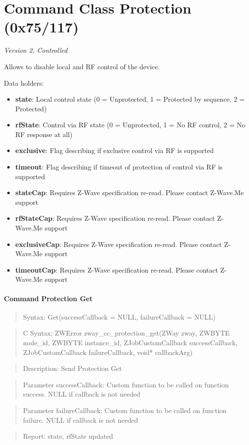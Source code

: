 \section{Command Class Protection (0x75/117)}

\textit{Version 2, Controlled}
\newline

Allows to disable local and RF control of the device.
\newline

\noindent
Data holders:

\begin{itemize}
\item \textbf{state}: Local control state (0 = Unprotected, 1 = Protected by sequence, 2 = Protected)
\item \textbf{rfState}: Control via RF state (0 = Unprotected, 1 = No RF control, 2 = No RF response at all)
\item \textbf{exclusive}: Flag describing if exclusive control via RF is supported
\item \textbf{timeout}: Flag describing if timeout of protection of control via RF is supported
\item \textbf{stateCap}: Requires Z-Wave specification re-read. Please contact Z-Wave.Me support
\item \textbf{rfStateCap}: Requires Z-Wave specification re-read. Please contact Z-Wave.Me support
\item \textbf{exclusiveCap}: Requires Z-Wave specification re-read. Please contact Z-Wave.Me support
\item \textbf{timeoutCap}: Requires Z-Wave specification re-read. Please contact Z-Wave.Me support
\end{itemize}

\paragraph{Command Protection Get}
\begin{quote}Syntax: Get(successCallback = NULL, failureCallback = NULL)\end{quote}
\begin{quote}C Syntax: ZWError zway\_cc\_protection\_get(ZWay zway, ZWBYTE node\_id, ZWBYTE instance\_id, ZJobCustomCallback successCallback, ZJobCustomCallback failureCallback, void* callbackArg)\end{quote}
\begin{quote}Description: Send Protection Get\end{quote}
\begin{quote}Parameter successCallback: Custom function to be called on function success. NULL if callback is not needed\end{quote}
\begin{quote}Parameter failureCallback: Custom function to be called on function failure. NULL if callback is not needed\end{quote}
\begin{quote}Report: state, rfState updated\end{quote}


